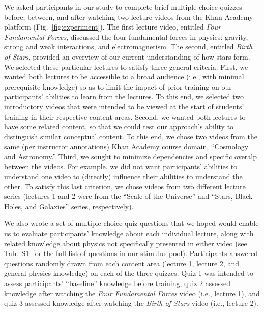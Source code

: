 \documentclass[10pt]{article}
\newcommand{\questions}{S1}
\begin{document}
We asked participants in our study to complete brief multiple-choice quizzes
before, between, and after watching two lecture videos from the Khan
Academy~\citep{Khan04} platform (Fig.~\ref{fig:experiment}). The first lecture
video, entitled \textit{Four Fundamental Forces}, discussed the four
fundamental forces in physics: gravity, strong and weak interactions, and
electromagnetism. The second, entitled \textit{Birth of Stars}, provided an
overview of our current understanding of how stars form. We selected these
particular lectures to satisfy three general criteria. First, we wanted both
lectures to be accessible to a broad audience (i.e., with minimal prerequisite
knowledge) so as to limit the impact of prior training on our participants'
abilities to learn from the lectures. To this end, we selected two introductory
videos that were intended to be viewed at the start of students' training in
their respective content areas. Second, we wanted both lectures to have some
related content, so that we could test our approach's ability to distinguish
similar conceptual content. To this end, we chose two videos from the same (per
instructor annotations) Khan Academy course domain, ``Cosmology and
Astronomy.'' Third, we sought to minimize dependencies and specific overalp
between the videos. For example, we did not want participants' abilities to
understand one video to (directly) influence their abilities to understand the
other. To satisfy this last criterion, we chose videos from two different
lecture series (lectures 1 and 2 were from the ``Scale of the Universe'' and
``Stars, Black Holes, and Galaxies'' series, respectively).

We also wrote a set of multiple-choice quiz questions that we hoped would
enable us to evaluate participants' knowledge about each individual lecture,
along with related knowledge about physics not specifically presented in either
video (see Tab.~\questions~for the full list of questions in our stimulus
pool). Participants answered questions randomly drawn from each content area
(lecture 1, lecture 2, and general physics knowledge) on each of the three
quizzes. Quiz 1 was intended to assess participants' ``baseline'' knowledge
before training, quiz 2 assessed knowledge after watching the \textit{Four
Fundamental Forces} video (i.e., lecture 1), and quiz 3 assessed knowledge
after watching the \textit{Birth of Stars} video (i.e., lecture 2).
\end{document}
